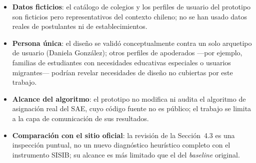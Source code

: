 \begin{itemize}
    \item \textbf{Datos ficticios}: el catálogo de colegios y los perfiles de usuario del prototipo son ficticios pero representativos del contexto chileno; no se han usado datos reales de postulantes ni de establecimientos.
    \item \textbf{Persona única}: el diseño se validó conceptualmente contra un solo arquetipo de usuario (Daniela González); otros perfiles de apoderados —por ejemplo, familias de estudiantes con necesidades educativas especiales o usuarios migrantes— podrían revelar necesidades de diseño no cubiertas por este trabajo.
    \item \textbf{Alcance del algoritmo}: el prototipo no modifica ni audita el algoritmo de asignación real del SAE, cuyo código fuente no es público; el trabajo se limita a la capa de comunicación de sus resultados.
    \item \textbf{Comparación con el sitio oficial}: la revisión de la Sección~4.3 es una inspección puntual, no un nuevo diagnóstico heurístico completo con el instrumento SISIB; su alcance es más limitado que el del \emph{baseline} original.
\end{itemize}
